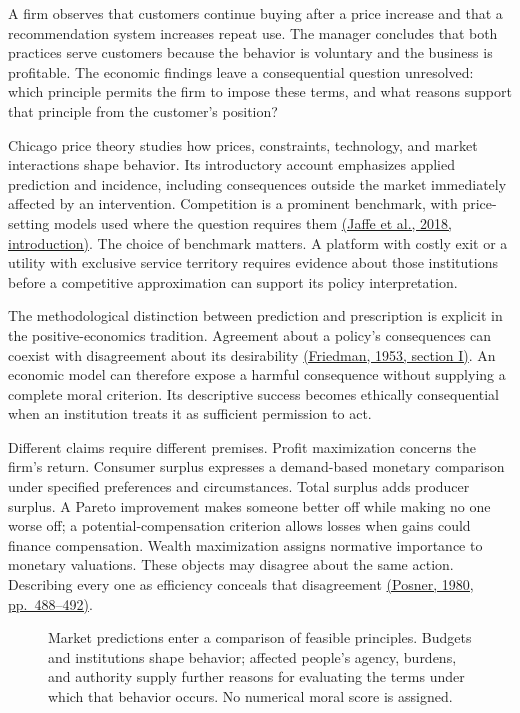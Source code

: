 \noindent \noindent A firm observes that customers continue buying after a price
increase and that a recommendation system increases repeat use. The
manager concludes that both practices serve customers because the
behavior is voluntary and the business is profitable. The economic
findings leave a consequential question unresolved: which principle
permits the firm to impose these terms, and what reasons support that
principle from the customer's position?

Chicago price theory studies how prices, constraints, technology, and
market interactions shape behavior. Its introductory account emphasizes
applied prediction and incidence, including consequences outside the
market immediately affected by an intervention. Competition is a
prominent benchmark, with price-setting models used where the question
requires them
\href{https://home.uchicago.edu/~cbm4/cpt/Introduction.pdf}{(Jaffe et
al., 2018, introduction)}. The choice of benchmark matters. A platform
with costly exit or a utility with exclusive service territory requires
evidence about those institutions before a competitive approximation can
support its policy interpretation.

The methodological distinction between prediction and prescription is
explicit in the positive-economics tradition. Agreement about a policy's
consequences can coexist with disagreement about its desirability
\href{https://edisciplinas.usp.br/pluginfile.php/8853288/mod_resource/content/1/FriedmanEssaysonPositiveEconomics\%20\%281\%29.pdf}{(Friedman,
1953, section I)}. An economic model can therefore expose a harmful
consequence without supplying a complete moral criterion. Its
descriptive success becomes ethically consequential when an institution
treats it as sufficient permission to act.

Different claims require different premises. Profit maximization
concerns the firm's return. Consumer surplus expresses a demand-based
monetary comparison under specified preferences and circumstances. Total
surplus adds producer surplus. A Pareto improvement makes someone better
off while making no one worse off; a potential-compensation criterion
allows losses when gains could finance compensation. Wealth maximization
assigns normative importance to monetary valuations. These objects may
disagree about the same action. Describing every one as efficiency
conceals that disagreement
\href{https://laws21.classes.ryansafner.com/readings/Posner-1980a.pdf}{(Posner,
1980, pp.~488--492)}.

\begin{figure}[htbp]
\centering

\caption{Market predictions enter a comparison of feasible principles. Budgets and institutions shape behavior; affected people’s agency, burdens, and authority supply further reasons for evaluating the terms under which that behavior occurs. No numerical moral score is assigned.}\label{fig:M09_price_theory_and_justification}
\end{figure}

